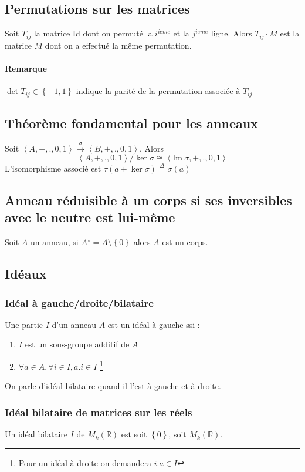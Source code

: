 \documentclass[a4paper,10pt]{article}
\newcommand{\ap}{ \rightarrow} %
\newcommand{\grp}[1]{\left\langle #1 \right\rangle} %
\newcommand{\set}[1]{\left\lbrace #1 \right\rbrace } %
\newcommand{\im}{\mathrm{Im}\:} %
\newcommand{\RR}{\mathbb{R}} %
\newcommand{\id}{\mathrm{Id}} %
\newcommand{\mfootnote}[1]{\up{(}\footnote{#1}\up{)}}
\begin{document}
 \subsection{Permutations sur les matrices}
  Soit $T_{ij}$ la matrice $\id$ dont on permuté la $i^{ieme}$ et la $j^{ieme}$ ligne. Alors $T_{ij}\cdot M$ est la matrice $M$ dont on a effectué la même permutation.

  \paragraph{Remarque} $\det T_{ij} \in \set{-1,1}$ indique la parité de la permutation associée à $T_{ij}$

  \subsection{Théorème fondamental pour les anneaux \label{thmfondamental}}
  Soit $\grp{A,+,.,0,1}\overset{\sigma}{\ap}\grp{B,+,.,0,1}$. Alors
  $$\grp{A,+,.,0,1}/\ker{\sigma} \cong \grp{\im \sigma,+,.,0,1}$$
  L'isomorphisme associé est $\tau (a+\ker{\sigma})\overset{\Delta}{=} \sigma(a)$

 \subsection{Anneau réduisible à un corps si ses inversibles avec le neutre est lui-même}
  Soit $A$ un anneau, si $A^\star=A\setminus \set{0}$ alors $A$ est un corps.

 \subsection{Idéaux}
  \subsubsection{Idéal à gauche/droite/bilataire}
    Une partie $I$ d'un anneau $A$ est un idéal à gauche ssi : 
    \begin{enumerate}
     \item $I$ est un sous-groupe additif de $A$
     \item $\forall a\in A, \forall i \in I, a.i \in I$
       \mfootnote{Pour un idéal à droite on demandera $i.a \in I$}
    \end{enumerate}

    On parle d'idéal bilataire quand il l'est à gauche et à droite.

  \subsubsection{Idéal bilataire de matrices sur les réels}
   Un idéal bilataire $I$ de $M_k(\RR)$ est soit $\set{0}$, soit $M_k(\RR)$.
\end{document}
